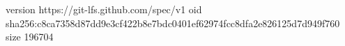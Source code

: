 version https://git-lfs.github.com/spec/v1
oid sha256:c8ca7358d87dd9e3cf422b8e7bdc0401ef62974fcc8dfa2e826125d7d949f760
size 196704
